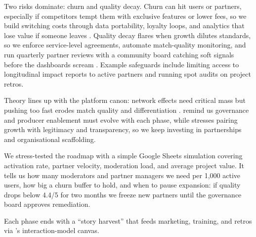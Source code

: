 Two risks dominate: churn and quality decay. Churn can hit users or partners, especially if competitors tempt them with exclusive features or lower fees, so we build switching costs through data portability, loyalty loops, and analytics that lose value if someone leaves \citep{FarrellSaloner1986,ShapiroVarian1999}. Quality decay flares when growth dilutes standards, so we enforce service-level agreements, automate match-quality monitoring, and run quarterly partner reviews with a community board catching soft signals before the dashboards scream \citep{Reillier2017}. Example safeguards include limiting access to longitudinal impact reports to active partners and running spot audits on project retros.

Theory lines up with the platform canon: network effects need critical mass but pushing too fast erodes match quality and differentiation \citep{Porter2008}. \citet{Choudary2016} remind us governance and producer enablement must evolve with each phase, while \citet{Srnicek2017} stresses pairing growth with legitimacy and transparency, so we keep investing in partnerships and organisational scaffolding.

We stress-tested the roadmap with a simple Google Sheets simulation covering activation rate, partner velocity, moderation load, and average project value. It tells us how many moderators and partner managers we need per 1,000 active users, how big a churn buffer to hold, and when to pause expansion: if quality drops below 4.4/5 for two months we freeze new partners until the governance board approves remediation.

Each phase ends with a ``story harvest'' that feeds marketing, training, and retros via \citet{Choudary2016}'s interaction-model canvas.
